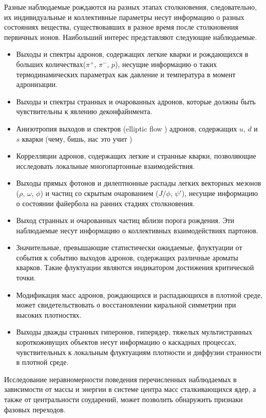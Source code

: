 Разные наблюдаемые рождаются на разных этапах столкновения, следовательно, их индивидуальные и коллективные параметры несут информацию о разных состояниях вещества, существовавших в разное время после столкновения первичных ионов. Наибольший интерес представляют следующие наблюдаемые.

\begin{itemize}
\item Выходы и спектры адронов, содержащих легкие кварки и рождающихся в больших количествах($\pi^{+}$, $\pi^{-}$, $p$), несущие информацию о таких термодинамических параметрах как давление и температура в момент адронизации.
\item Выходы и спектры странных и очарованных адронов, которые должны быть чувствительны к явлению деконфайнмента.
\item Анизотропия выходов и спектров (elliptic flow \todo) адронов, содержащих $u$, $d$ и $s$ кварки (чему, бишь, нас это учит \todo) 
\item Коррелляции адронов, содержащих легкие и странные кварки, позволяющие исследовать локальные многопартонные взаимодействия.
\item Выходы прямых фотонов и дилептнонные распады легких векторных мезонов ($\rho$, $\omega$, $\phi$) и частиц со скрытым очарованием ($J/\phi$, $\psi'$), несущие информацию о состоянии файербола на ранних стадиях столкновения.
\item Выход странных и очарованных частиц вблизи порога рождения. Эти наблюдаемые несут информацию о коллективных взаимодействиях партонов.
\item Значительные, превышающие статистически ожидаемые, флуктуации от события к событию выходов адронов, содержащих различные ароматы кварков. Такие флуктуации являются индикатором достижения критической точки.
\item Модификация масс адронов, рождающихся и распадающихся в плотной среде, может свидетельствовать о восстановлении киральной симметрии при высоких плотностях.
\item Выходы дважды странных гиперонов, гиперядер, тяжелых мультистранных короткоживущих объектов несут информацию о каскадных процессах, чувствительных к локальным флуктуациям плотности и диффузии странности в плотной среде.
\end{itemize}

Исследование неравномерности поведения перечисленных наблюдаемых в зависимости от массы и энергии в системе центра масс сталкивающихся ядер, а также от центральности соударений, может позволить обнаружить признаки фазовых переходов.

